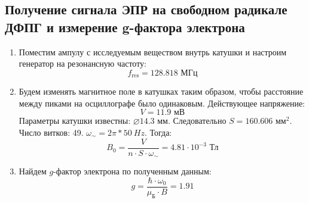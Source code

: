 \documentclass[a4paper, 12pt]{article}
\begin{document}
	\subsection{Получение сигнала ЭПР  на свободном радикале ДФПГ и измерение g-фактора электрона}
	\begin{enumerate}
		\item Поместим ампулу с исследуемым веществом внутрь катушки и настроим генератор на резонансную частоту:
		\begin{equation*}
			f_{\text{res}}=128.818\text{ МГц}
		\end{equation*}
		\item Будем изменять магнитное поле в катушках таким образом, чтобы расстояние между пиками на осциллографе было одинаковым. Действующее напряжение:
		\begin{equation*}
			V=11.9\text{ мВ}
		\end{equation*}
		Параметры катушки известны: $\diameter 14.3$ мм. Следовательно $S=160.606$ мм$^{2}$. Число витков: 49. $\omega_{\sim}=2\pi*50\ Hz$. Тогда:
		\begin{equation*}
			B_0=\frac{V}{n\cdot S\cdot\omega_{\sim}}=4.81\cdot 10^{-3}\text{ Тл}
		\end{equation*}
		\item Найдем $g$-фактор электрона по полученным данным:
		\begin{equation*}
			g=\frac{\hbar\cdot\omega_0}{\mu_{\text{Б}}\cdot B}=1.91
		\end{equation*}
	\end{enumerate}
\end{document}
